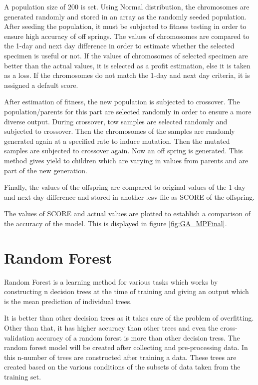 \documentclass[BTech]{srmuthesis}
\begin{document}
A population size of 200 is set. Using Normal distribution, the chromosomes are generated randomly and stored in an array as the randomly seeded population. After seeding the population, it must be subjected to fitness testing in order to ensure high accuracy of off springs. The values of chromosomes are compared to the 1-day and next day difference in order to estimate whether the selected specimen is useful or not. If the values of chromosomes of selected specimen are better than the actual values, it is selected as a profit estimation, else it is taken as a loss. If the chromosomes do not match the 1-day and next day criteria, it is assigned a default score.

After estimation of fitness, the new population is subjected to crossover. The population/parents for this part are selected randomly in order to ensure a more diverse output. During crossover, tow samples are selected randomly and subjected to crossover. Then the chromosomes of the samples are randomly generated again at a specified rate to induce mutation. Then the mutated samples are subjected to crossover again. Now an off spring is generated. This method gives yield to children which are varying in values from parents and are part of the new generation.

Finally, the values of the offspring are compared to original values of the 1-day and next day difference and stored in another .csv file as SCORE of the offspring. 

The values of SCORE and actual values are plotted to establish a comparison of the accuracy of the model. This is displayed in figure \ref{fig:GA_MPFinal}. 

\section{Random Forest}
Random Forest is a learning method for various tasks which works by constructing n decision trees at the time of training and giving an output which is the mean prediction of individual trees. 

It is better than other decision trees as it takes care of the problem of overfitting. Other than that, it has higher accuracy than other trees and even the cross-validation accuracy of a random forest is more than other decision tress. The random forest model will be created after collecting and pre-processing data. In this n-number of trees are constructed after training a data. These trees are created based on the various conditions of the subsets of data taken from the training set.
\end{document}
